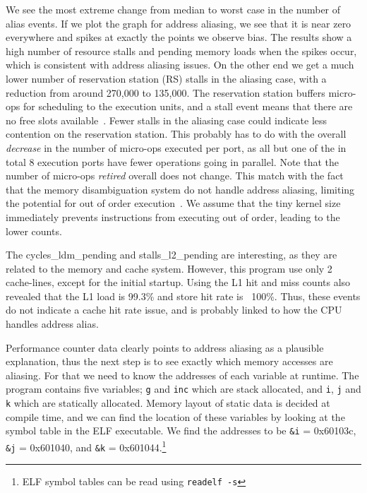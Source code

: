 \documentclass[prodmode,acmtaco]{acmsmall}
\begin{document}
We see the most extreme change from median to worst case in the number of alias events. 
If we plot the graph for address aliasing, we see that it is near zero everywhere and spikes at exactly the points we observe bias. 
The results show a high number of resource stalls and pending memory loads when the spikes occur, which is consistent with address aliasing issues.
On the other end we get a much lower number of reservation station (RS) stalls in the aliasing case, with a reduction from around 270,000 to 135,000.
The reservation station buffers micro-ops for scheduling to the execution units, and a stall event means that there are no free slots available~\cite[Table 19-2]{Volume3B}.
Fewer stalls in the aliasing case could indicate less contention on the reservation station.
This probably has to do with the overall \emph{decrease} in the number of micro-ops executed per port, as all but one of the in total 8 execution ports have fewer operations going in parallel.
Note that the number of micro-ops \emph{retired} overall does not change.%
This match with the fact that the memory disambiguation system do not handle address aliasing, limiting the potential for out of order execution~\cite[Page 2-20]{OptimizationManual}.
We assume that the tiny kernel size immediately prevents instructions from executing out of order, leading to the lower counts.

The cycles\_ldm\_pending and stalls\_l2\_pending are interesting, as they are related to the memory and cache system.
However, this program use only 2 cache-lines, except for the initial startup.
Using the L1 hit and miss counts also revealed that the L1 load is 99.3\% and store hit rate is ~100\%.
Thus, these events do not indicate a cache hit rate issue, and is probably linked to how the CPU handles address alias.

Performance counter data clearly points to address aliasing as a plausible explanation, thus the next step is to see exactly which memory accesses are aliasing. 
For that we need to know the addresses of each variable at runtime.
The program contains five variables; \texttt{g} and \texttt{inc} which are stack allocated, and \texttt{i}, \texttt{j} and \texttt{k} which are statically allocated.
Memory layout of static data is decided at compile time, and we can find the location of these variables by looking at the symbol table in the ELF executable.
We find the addresses to be \texttt{\&i} = 0x60103c, \texttt{\&j} = 0x601040, and \texttt{\&k} = 0x601044.\footnote{ELF symbol tables can be read using \texttt{readelf -s}}
\end{document}
